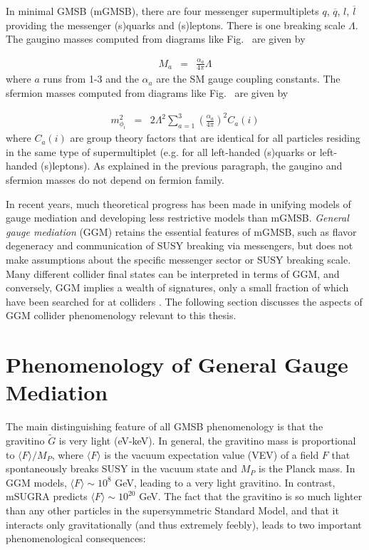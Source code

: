 \documentclass[dissertation.tex]{subfiles}
\begin{document}
In minimal GMSB (mGMSB), there are four messenger supermultiplets $q$, $\overline{q}$, $l$, $\overline{l}$ providing the messenger (s)quarks and (s)leptons.  There is one breaking scale $\Lambda$.  The gaugino masses computed from diagrams like Fig.~ are given by

\begin{eqnarray}
\label{eq:m_gaugino}
M_{a} &=& \frac{\alpha_{a}}{4\pi}\Lambda
\end{eqnarray}
%
where $a$ runs from 1-3 and the $\alpha_{a}$ are the SM gauge coupling constants.  The sfermion masses computed from diagrams like Fig.~ are given by

\begin{eqnarray}
\label{eq:m_sfermion}
m_{\phi_{i}}^{2} &=& 2\Lambda^{2}\sum_{a=1}^{3}(\frac{\alpha_{a}}{4\pi})^{2}C_{a}(i)
\end{eqnarray}
%
where $C_{a}(i)$ are group theory factors that are identical for all particles residing in the same type of supermultiplet (e.g. for all left-handed (s)quarks or left-handed (s)leptons).  As explained in the previous paragraph, the gaugino and sfermion masses do not depend on fermion family.

In recent years, much theoretical progress has been made in unifying models of gauge mediation and developing less restrictive models than mGMSB.  \textit{General gauge mediation} (GGM) \cite{PTPS.177.143} retains the essential features of mGMSB, such as flavor degeneracy and communication of SUSY breaking via messengers, but does not make assumptions about the specific messenger sector or SUSY breaking scale.  Many different collider final states can be interpreted in terms of GGM, and conversely, GGM implies a wealth of signatures, only a small fraction of which have been searched for at colliders \cite{Aad2012519,PhysRevLett.104.011801,CMS-PAS-SUS-11-009}.  The following section discusses the aspects of GGM collider phenomenology relevant to this thesis.

\section{Phenomenology of General Gauge Mediation}
\label{sec:Phenomenology of General Gauge Mediation}

The main distinguishing feature of all GMSB phenomenology is that the gravitino $\widetilde{G}$ is very light (eV-keV).  In general, the gravitino mass is proportional to $\langle F\rangle/M_{P}$, where $\langle F\rangle$ is the vacuum expectation value (VEV) of a field $F$ that spontaneously breaks SUSY in the vacuum state and $M_{P}$ is the Planck mass.  In GGM models, $\langle F\rangle \sim 10^{8}$ GeV, leading to a very light gravitino.  In contrast, mSUGRA predicts $\langle F\rangle \sim 10^{20}$ GeV.  The fact that the gravitino is so much lighter than any other particles in the supersymmetric Standard Model, and that it interacts only gravitationally (and thus extremely feebly), leads to two important phenomenological consequences:
\end{document}
